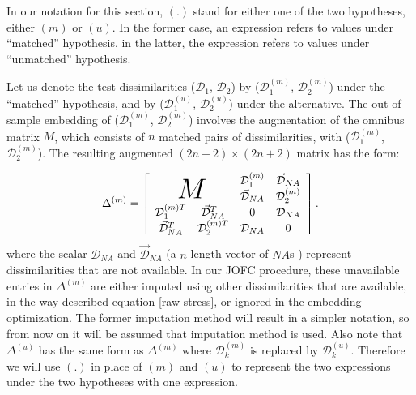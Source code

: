 \documentclass[12pt,oneside,final]{thesis}
\begin{document}
\begin{remark}
In our notation for this section, $(.)$  stand for either one of the two hypotheses, either $(m)$  or   $(u)$. In the former case, an expression refers to values under  ``matched'' hypothesis, in the latter, the expression refers to values under  ``unmatched''   hypothesis.
\end{remark}
Let us denote the test dissimilarities ($\mathcal{D}_1$, $\mathcal{D}_2$)  by  ($\mathcal{D}_1^{(m)}$, $\mathcal{D}_2^{(m)}$)  under the  ``matched'' hypothesis, and  by ($\mathcal{D}_1^{(u)}$, $\mathcal{D}_2^{(u)}$)  under the alternative. The out-of-sample embedding of ($\mathcal{D}_1^{(m)}$, $\mathcal{D}_2^{(m)}$) involves the  augmentation of  the omnibus matrix $M$, which consists of $n$ matched  pairs of dissimilarities,  with ($\mathcal{D}_1^{(m)}$, $\mathcal{D}_2^{(m)}$). The resulting augmented  $(2n+2)\times (2n+2)$ matrix  has the form:

 \begin{equation}
\Delta^{(m)}=  \left[ \begin{array}{cccc}
          \multicolumn{2}{c}{\multirow{2}{*}{\Huge{$M$}}} &  \mathcal{D}_1^{(m)} &\vec{\mathcal{D}}_{NA}\\
        & &  \vec{\mathcal{D}}_{NA}   & \mathcal{D}_2^{(m)} \\
  			\mathcal{D}_1^{(m)T} & \vec{\mathcal{D}}_{NA}^T  &  0 & \mathcal{D}_{NA} \\
         \vec{\mathcal{D}}_{NA}^T & \mathcal{D}_2^{(m)T} & \mathcal{D}_{NA} &0\\
     \end{array}  \right].     \label{aug_omnibus} 
\end{equation}  where
the scalar $\mathcal{D}_{NA}$ and    $\vec{\mathcal{D}}_{NA}$ (a $n$-length vector of $NA$s ) represent dissimilarities that are not available. 
In our JOFC procedure, these unavailable entries in $\Delta^{(m)}$ are either imputed using other dissimilarities that are available, in the way described  equation \eqref{raw-stress}, or ignored in the embedding optimization. The former imputation method will result in  a simpler  notation, so from now on  it will be assumed that imputation method is used. Also note that $\Delta^{(u)}$  has the same form as $\Delta^{(m)}$ where $\mathcal{D}_k^{(m)}$ is replaced by $\mathcal{D}_k^{(u)}$. Therefore we will use  $(.)$ in place of $(m)$ and $(u)$ to represent the two expressions under the two hypotheses with one expression. 
\end{document}
